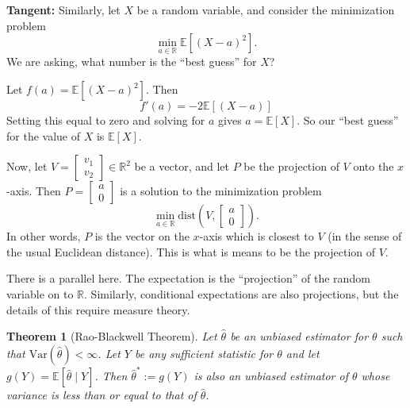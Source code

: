 \documentclass[10pt]{article}
\newtheorem{theorem}{Theorem}
\theoremstyle{definition}
\newcommand{\vt}{\vskip 5mm} %
\newcommand{\Fl}{\vt\noindent\textbf} %
\newcommand{\1}[1]{\textbf{1}_{\left[#1\right]}} %
\def\R{\mathbb{R}} %
\def\E{\mathbb{E}} %
\def\dist{\text{dist}} %
\def\Var{\mathrm{Var}} %
\begin{document}
\Fl{Tangent:} Similarly, let $X$ be a random variable, and consider the minimization problem
\begin{equation*}
  \min_{a\in \R} \E\left[(X-a)^{2} \right].
\end{equation*}
We are asking, what number is the ``best guess'' for $X$?

Let $f(a) = \E\left[(X-a)^{2} \right]$. Then
\begin{equation*}
  f'(a) = -2 \E\left[(X-a) \right]
\end{equation*}
Setting this equal to zero and solving for $a$ gives $a= \E\left[X \right]$.
So our ``best guess'' for the value of $X$ is $\E\left[X \right]$.

Now, let $V=
\begin{bmatrix}
  v_{1}\\v_{2}
\end{bmatrix}
\in \R^{2}$ be a vector, and let $P$ be the projection of
$V$ onto the $x$-axis. Then $P=
\begin{bmatrix}
  a\\0
\end{bmatrix}
$ is a solution to the minimization problem
\begin{equation*}
  \min_{a\in \R} \dist\left(V,
  \begin{bmatrix}
    a\\0
  \end{bmatrix}
  \right).
\end{equation*}
In other words, $P$ is the vector on the $x$-axis which is closest to $V$ (in
the sense of the usual Euclidean distance). This is what is means to be the
projection of $V$.

There is a parallel here. The expectation is the ``projection'' of the random
variable on to $\R$. Similarly, conditional expectations are also projections,
but the details of this require measure theory.





\begin{theorem}[Rao-Blackwell Theorem]
  \label{thm:rao-blackwell-theorem}
  Let $\widehat{\theta}$ be an unbiased estimator for $\theta$ such that
  $\Var(\widehat{\theta})<\infty$. Let $Y$ be any sufficient statistic for
  $\theta$ and let $g(Y) = \E[\widehat{\theta}\mid Y]$. Then
  $\widehat{\theta}^{*}:=g(Y)$ is also an unbiased estimator of $\theta$ whose
  variance is less than or equal to that of $\widehat{\theta}$.
\end{theorem}
\end{document}
